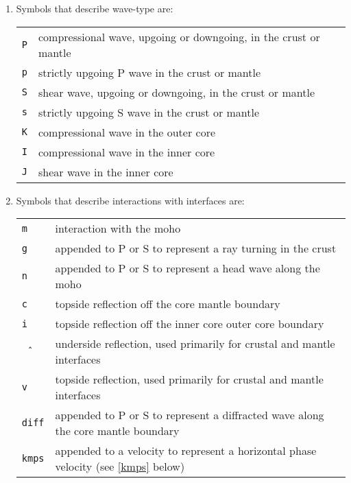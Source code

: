 \begin{enumerate}
\item Symbols that describe wave-type are:

\begin{tabular}{lp{5.0in}}
\texttt{P} & compressional wave, upgoing or downgoing, in the crust or mantle \\
\texttt{p} & strictly upgoing P wave in the crust or mantle \\
\texttt{S} & shear wave, upgoing or downgoing, in the crust or mantle \\
\texttt{s} & strictly upgoing S wave in the crust or mantle \\
\texttt{K} & compressional wave in the outer core \\
\texttt{I} & compressional wave in the inner core \\
\texttt{J} & shear wave in the inner core \\
\end{tabular}

\item Symbols that describe interactions with interfaces are:

\begin{tabular}{lp{5.0in}}
\texttt{m} & interaction with the moho \\
\texttt{g} & appended to P or S to represent a ray turning in the crust \\
\texttt{n} & appended to P or S to represent a head wave along the moho \\
\texttt{c} & topside reflection off the core mantle boundary \\
\texttt{i} & topside reflection off the inner core outer core boundary \\
\texttt{\^\,} & underside reflection, used primarily for crustal and mantle interfaces \\
\texttt{v} & topside reflection, used primarily for crustal and mantle interfaces \\
\texttt{diff} & appended to P or S to represent a diffracted wave along the core mantle boundary \\
\texttt{kmps} & appended to a velocity to represent a horizontal phase velocity (see
\ref{kmps} below)\\
\end{tabular}


\end{enumerate}
